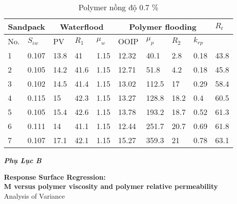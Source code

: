 \documentclass[12pt,a4paper]{article}
\begin{document}
\begin{table}[]
\centering
\caption{Polymer nồng độ 0.7 \%}
\label{my-label}
\begin{tabularx}{\textwidth}{@{}XX|XXX|XXXX|X@{}}
\toprule
\multicolumn{2}{c}{Sandpack} & \multicolumn{3}{c}{Waterflood} & \multicolumn{4}{c}{Polymer flooding} & $R_t$ \\ \midrule
No.        & $S_{iw}$        & PV      & $R_1$    & $\mu_w$   & OOIP   & $\mu_p$  & $R_2$ & $k_{rp}$ &       \\
1          & 0.107           & 13.8    & 41       & 1.15      & 12.32  & 40.1     & 2.8   & 0.18     & 43.8  \\
2          & 0.105           & 14.2    & 41.6     & 1.15      & 12.71  & 51.8     & 4.2   & 0.18     & 45.8  \\
3          & 0.102           & 14.5    & 41.4     & 1.15      & 13.02  & 112.5    & 17    & 0.29     & 58.4  \\
4          & 0.115           & 15      & 42.3     & 1.15      & 13.27  & 128.8    & 18.2  & 0.4      & 60.5  \\
5          & 0.105           & 15.4    & 42.6     & 1.15      & 13.78  & 193.2    & 18.7  & 0.52     & 61.3  \\
6          & 0.111           & 14      & 41.1     & 1.15      & 12.44  & 251.7    & 20.7  & 0.69     & 61.8  \\
7          & 0.107           & 17.1    & 42.1     & 1.15      & 15.27  & 359.3    & 21    & 0.78     & 63.1  \\ \bottomrule
\end{tabularx}
\end{table}
\clearpage
\noindent
\Large{\textit{\textbf{Phụ Lục B}}}\\
\noindent
\textbf{\Large{Response Surface Regression:\\
M versus polymer viscosity and polymer relative permeability}}\\
Analysis of Variance
\end{document}
